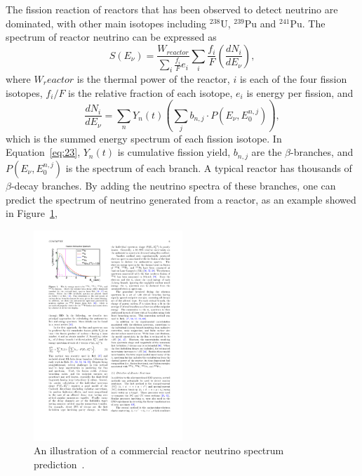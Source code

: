     The fission reaction of reactors that has been observed to detect neutrino are \Ulow dominated, with other main isotopes including $^{238}$U, $^{239}$Pu and $^{241}$Pu.
    The spectrum of reactor neutrino can be expressed as
    \begin{equation}\label{eq2.2}
        S(E_\nu) = \frac{W_{reactor}}{\sum_i \frac{f_i}{F}e_i}\sum_i\frac{f_i}{F}(\frac{dN_i}{dE_\nu}),
    \end{equation}
    where $W_reactor$ is the thermal power of the reactor, $i$ is each of the four fission isotopes, $f_i/F$ is the relative fraction of each isotope, $e_i$ is energy per fission, and 
    \begin{equation}
        \frac{dN_i}{dE_\nu} = \sum_n Y_n(t)(\sum_j b_{n,j}\cdot P(E_\nu, E_0^{n,j})),
        \label{eq:23}
    \end{equation}
    which is the summed energy spectrum of each fission isotope.
    In Equation~\ref{eq:23}, $Y_n(t)$ is cumulative fission yield, $b_{n,j}$ are the $\beta$-branches, and $P(E_\nu, E_0^{n,j})$ is the spectrum of each branch.
    A typical reactor has thousands of $\beta$-decay branches. 
    By adding the neutrino spectra of these branches, one can predict the spectrum of neutrino generated from a reactor, as an example showed in Figure~\ref{fig:2.1},
    \begin{figure}[h!]\label{fig:2.1}
    \centering
    \includegraphics[width=0.5\textwidth]{Figures/RxNeutrinoSpec.pdf}
    \caption[Reactor neutrino spectrum]{An illustration of a commercial reactor neutrino spectrum prediction~\cite{bib:Qian2019}.}
    \end{figure}  

